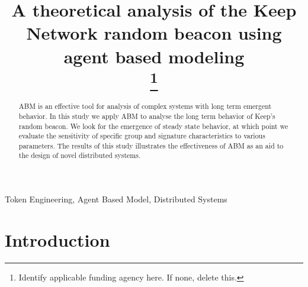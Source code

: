 \documentclass[conference]{IEEEtran}
\begin{document}
\title{A theoretical analysis of the Keep Network random beacon using agent based modeling \\
\thanks{Identify applicable funding agency here. If none, delete this.}
}

\author{

\and
{}

\and
{}

\and
{}

\and
{}
}

\maketitle

\begin{abstract}
    ABM is an effective tool for analysis of complex systems with long term emergent behavior. In this study we apply ABM to analyse the long term behavior of Keep’s random beacon. We look for the emergence of steady state behavior, at which point we evaluate the sensitivity of specific group and signature characteristics to various parameters. The results of this study illustrates the effectiveness of ABM as an aid to the design of novel distributed systems. 

\end{abstract}

\begin{IEEEkeywords}
Token Engineering, Agent Based Model, Distributed Systems
\end{IEEEkeywords}

\section{Introduction}
\end{document}
